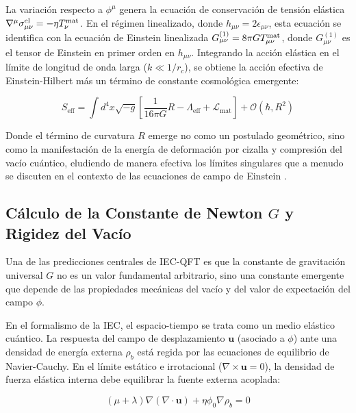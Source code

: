 \documentclass[11pt,a4paper]{article}
\begin{document}
La variación respecto a \( \phi^\mu \) genera la ecuación de conservación de tensión elástica \( \nabla^\mu \sigma_{\mu\nu}^{\rm el} = - \eta T_\nu^{\rm mat} \). En el régimen linealizado, donde \( h_{\mu\nu} = 2\epsilon_{\mu\nu} \), esta ecuación se identifica con la ecuación de Einstein linealizada \( G_{\mu\nu}^{(1)} = 8\pi G T_{\mu\nu}^{\rm mat} \), donde \( G_{\mu\nu}^{(1)} \) es el tensor de Einstein en primer orden en \( h_{\mu\nu} \). Integrando la acción elástica en el límite de longitud de onda larga (\( k \ll 1/r_c \)), se obtiene la acción efectiva de Einstein-Hilbert más un término de constante cosmológica emergente:

\begin{equation}
	S_{\text{eff}} = \int d^4x \sqrt{-g} \left[ \frac{1}{16\pi G} R - \Lambda_{\text{eff}} + \mathcal{L}_{\text{mat}} \right] + \mathcal{O}(\hbar, R^2)
\end{equation}

Donde el término de curvatura \( R \) emerge no como un postulado geométrico, sino como la manifestación de la energía de deformación por cizalla y compresión del vacío cuántico, eludiendo de manera efectiva los límites singulares que a menudo se discuten en el contexto de las ecuaciones de campo de Einstein \cite{Einstein1915}.

\subsection{Cálculo de la Constante de Newton \( G \) y Rigidez del Vacío}

Una de las predicciones centrales de IEC-QFT es que la constante de gravitación universal \( G \) no es un valor fundamental arbitrario, sino una constante emergente que depende de las propiedades mecánicas del vacío y del valor de expectación del campo \( \phi \). 

En el formalismo de la IEC, el espacio-tiempo se trata como un medio elástico cuántico. La respuesta del campo de desplazamiento \( \mathbf{u} \) (asociado a \( \phi \)) ante una densidad de energía externa \( \rho_b \) está regida por las ecuaciones de equilibrio de Navier-Cauchy. En el límite estático e irrotacional (\( \nabla \times \mathbf{u} = 0 \)), la densidad de fuerza elástica interna debe equilibrar la fuente externa acoplada:

\begin{equation}
	(\mu + \lambda) \nabla (\nabla \cdot \mathbf{u}) + \eta \phi_0 \nabla \rho_b = 0
\end{equation}
\end{document}
